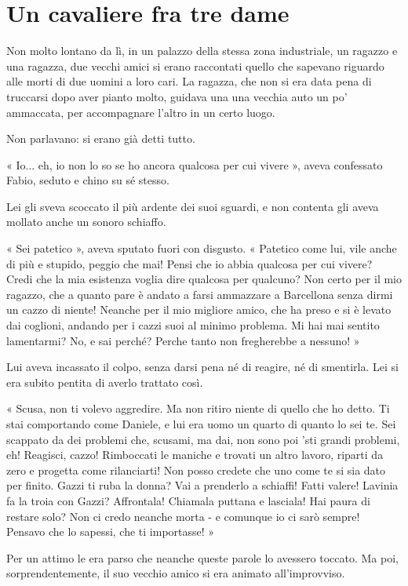 \chapter{Un cavaliere fra tre dame}

Non molto lontano da lì, in un palazzo della stessa zona industriale, un ragazzo e una ragazza, due vecchi amici si erano raccontati quello che sapevano riguardo alle morti di due uomini a loro cari. La ragazza, che non si era data pena di truccarsi dopo aver pianto molto, guidava una una vecchia auto un po' ammaccata, per accompagnare l'altro in un certo luogo.

Non parlavano: si erano già detti tutto.

« Io... eh, io non lo so se ho ancora qualcosa per cui vivere », aveva confessato Fabio, seduto e chino su sé stesso.

Lei gli sveva scoccato il più ardente dei suoi sguardi, e non contenta gli aveva mollato anche un sonoro schiaffo.

« Sei patetico », aveva sputato fuori con disgusto. « Patetico come lui, vile anche di più e stupido, peggio che mai! Pensi che io abbia qualcosa per cui vivere? Credi che la mia esistenza voglia dire qualcosa per qualcuno? Non certo per il mio ragazzo, che a quanto pare è andato a farsi ammazzare a Barcellona senza dirmi un cazzo di niente! Neanche per il mio migliore amico, che ha preso e si è levato dai coglioni, andando per i cazzi suoi al minimo problema. Mi hai mai sentito lamentarmi? No, e sai perché? Perche tanto non fregherebbe a nessuno! »

Lui aveva incassato il colpo, senza darsi pena né di reagire, né di smentirla. Lei si era subito pentita di averlo trattato così. 

« Scusa, non ti volevo aggredire. Ma non ritiro niente di quello che ho detto. Ti stai comportando come Daniele, e lui era uomo un quarto di quanto lo sei te. Sei scappato da dei problemi che, scusami, ma dai, non sono poi 'sti grandi problemi, eh! Reagisci, cazzo! Rimboccati le maniche e trovati un altro lavoro, riparti da zero e progetta come rilanciarti! Non posso credete che uno come te si sia dato per finito. Gazzi ti ruba la donna? Vai a prenderlo a schiaffi! Fatti valere! Lavinia fa la troia con Gazzi? Affrontala! Chiamala puttana e lasciala! Hai paura di restare solo? Non ci credo neanche morta - e comunque io ci sarò sempre! Pensavo che lo sapessi, che ti importasse! »

Per un attimo le era parso che neanche queste parole lo avessero toccato. Ma poi, sorprendentemente, il suo vecchio amico si era animato all'improvviso.

